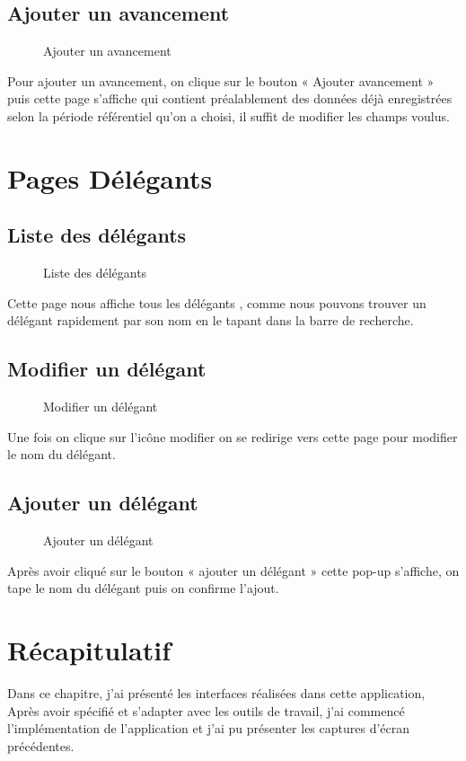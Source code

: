 \subsection{Ajouter un avancement}
\begin{figure}[H]
    \begin{center}
        \caption{Ajouter un avancement}
    \end{center}
\end{figure}
Pour ajouter un avancement, on clique sur le bouton « Ajouter avancement » puis cette page s'affiche qui contient préalablement des données déjà enregistrées selon la période référentiel qu'on a choisi, il suffit de modifier les champs voulus.
\section{Pages Délégants}
\subsection{Liste des délégants}
\begin{figure}[H]
    \begin{center}
        \caption{Liste des délégants}
    \end{center}
\end{figure}
Cette page nous affiche tous les délégants , comme nous pouvons trouver un délégant rapidement par son nom en le tapant dans la barre de recherche.
\subsection{Modifier un délégant}
\begin{figure}[H]
    \begin{center}
        \caption{Modifier un délégant}
    \end{center}
\end{figure}
Une fois on clique sur l'icône modifier on se redirige vers cette page pour modifier le nom du délégant.
\subsection{Ajouter un délégant}
\begin{figure}[H]
    \begin{center}
        \caption{Ajouter un délégant}
    \end{center}
\end{figure}
Après avoir cliqué sur le bouton « ajouter un délégant » cette pop-up s'affiche, on tape le nom du délégant puis on confirme l'ajout.

\section{Récapitulatif}

Dans ce chapitre, j'ai présenté les interfaces réalisées dans cette application,
Après avoir spécifié et s'adapter avec les outils de travail, j'ai commencé l'implémentation de
l’application et j'ai pu présenter les captures d’écran précédentes.
